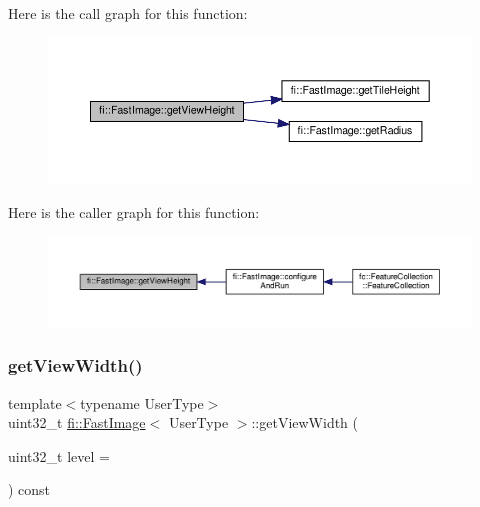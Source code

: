 Here is the call graph for this function\+:
\nopagebreak
\begin{figure}[H]
\begin{center}
\leavevmode
\includegraphics[width=350pt]{dc/d6b/classfi_1_1FastImage_a0a92ed9c575ad2664b1e96422375543c_cgraph}
\end{center}
\end{figure}
Here is the caller graph for this function\+:
\nopagebreak
\begin{figure}[H]
\begin{center}
\leavevmode
\includegraphics[width=350pt]{dc/d6b/classfi_1_1FastImage_a0a92ed9c575ad2664b1e96422375543c_icgraph}
\end{center}
\end{figure}
\mbox{\label{classfi_1_1FastImage_a21092b9c0fe86ea190291fc79901dc93}} 
\subsubsection{\texorpdfstring{get\+View\+Width()}{getViewWidth()}}
{\footnotesize\ttfamily template$<$typename User\+Type$>$ \\
uint32\+\_\+t \hyperlink{classfi_1_1FastImage}{fi\+::\+Fast\+Image}$<$ User\+Type $>$\+::get\+View\+Width (\begin{DoxyParamCaption}\item[{uint32\+\_\+t}]{level = {} }\end{DoxyParamCaption}) const\hspace{0.3cm}{\ttfamily [inline]}}



